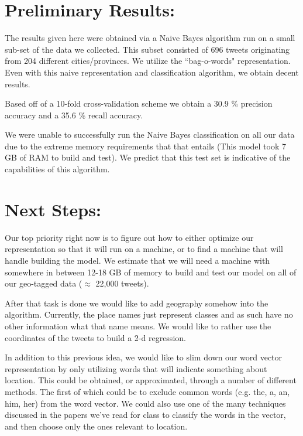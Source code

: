 \documentclass[12pt]{article}
\begin{document}
\section*{Preliminary Results:}
The results given here were obtained via a Naive Bayes algorithm run on a small sub-set of the data we collected. This subset consisted of 696 tweets originating from 204 different cities/provinces. We utilize the ``bag-o-words" representation. Even with this naive representation and classification algorithm, we obtain decent results. 

Based off of a 10-fold cross-validation scheme we obtain a 30.9 \% precision accuracy and a 35.6 \% recall accuracy. 

We were unable to successfully run the Naive Bayes classification on all our data due to the extreme memory requirements that that entails (This model took 7 GB of RAM to build and test). We predict that this test set is indicative of the capabilities of this algorithm. 

\section*{Next Steps:}
Our top priority right now is to figure out how to either optimize our representation so that it will run on a machine, or to find a machine that will handle building the model. We estimate that we will need a machine with somewhere in between 12-18 GB of memory to build and test our model on all of our geo-tagged data ($\approx$ 22,000 tweets). 

After that task is done we would like to add geography somehow into the algorithm. Currently, the place names just represent classes and as such have no other information what that name means. We would like to rather use the coordinates of the tweets to build a 2-d regression. 

In addition to this previous idea, we would like to slim down our word vector representation by only utilizing words that will indicate something about location. This could be obtained, or approximated,  through a number of different methods. The first of which could be to exclude common words (e.g. the, a, an, him, her) from the word vector. We could also use one of the many techniques discussed in the papers we've read for class to classify the words in the vector, and then choose only the ones relevant to location. 
\end{document}

